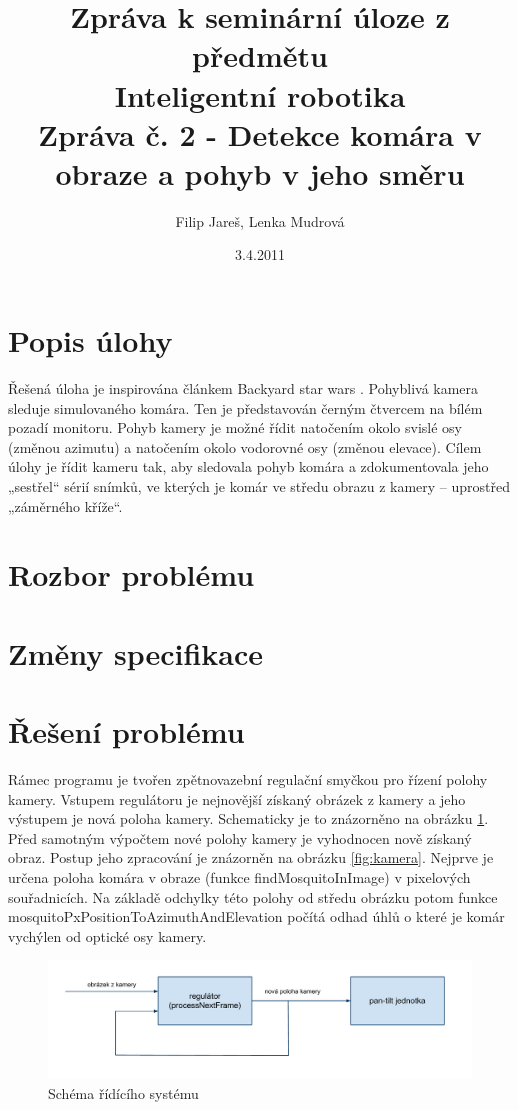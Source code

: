 \documentclass[a4paper,10pt]{article}
\title{Zpráva k seminární úloze z předmětu\\ Inteligentní robotika \\ {\small Zpráva č. 2 - Detekce komára v obraze a pohyb v jeho směru}}
\author{Filip Jareš, Lenka Mudrová}
\date{3.4.2011}
\begin{document}
\maketitle

\section{Popis úlohy}

Řešená úloha je inspirována článkem Backyard star wars \cite{clanek}. Pohyblivá kamera sleduje simulovaného komára. Ten je představován černým čtvercem na bílém pozadí monitoru. Pohyb kamery je možné řídit natočením okolo svislé osy (změnou azimutu) a natočením okolo vodorovné osy (změnou elevace). Cílem úlohy je řídit kameru tak, aby sledovala pohyb komára a zdokumentovala jeho „sestřel“ sérií snímků, ve kterých je komár ve středu obrazu z kamery – uprostřed „záměrného kříže“.

\section{Rozbor problému}
\section{Změny specifikace}
\section{Řešení problému}

Rámec programu je tvořen zpětnovazební regulační smyčkou pro řízení polohy kamery. Vstupem regulátoru je nejnovější získaný obrázek z kamery a jeho výstupem je nová poloha kamery. Schematicky je to znázorněno na obrázku \ref{fig:rid_system}.
Před samotným výpočtem nové polohy kamery je vyhodnocen nově získaný obraz. Postup jeho zpracování je znázorněn na obrázku \ref{fig:kamera}.
Nejprve je určena poloha komára v obraze (funkce findMosquitoInImage) v pixelových souřadnicích. Na základě odchylky této polohy od středu obrázku potom funkce mosquitoPxPositionToAzimuthAndElevation počítá odhad úhlů o které je komár vychýlen od optické osy kamery.

\begin{figure}[!htb]
    \centering
     \includegraphics[width=1\columnwidth]{pics/schema_ridiciho_systemu}
     \caption{Schéma řídícího systému\label{fig:rid_system}}
\end{figure}
\end{document}
